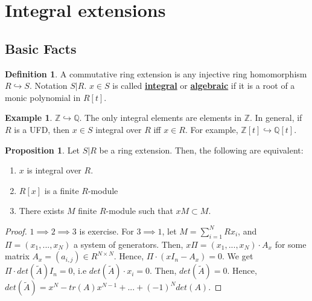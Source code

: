 \documentclass{article}
\theoremstyle{definition}
\theoremstyle{definition}
\theoremstyle{definition}
\newtheorem{proposition}{Proposition}[section]
\theoremstyle{definition}
\theoremstyle{definition}
\newtheorem{definition}{Definition}[section]
\theoremstyle{definition}
\theoremstyle{definition}
\newtheorem{example}{Example}[section]
\begin{document}
\section{Integral extensions}

\subsection{Basic Facts}
\begin{tcolorbox}[colback=purple!5!white,colframe=purple!75!black]
\begin{definition}
A commutative ring extension is any injective ring homomorphism $R\hookrightarrow S$. Notation $S|R$. $x\in S$ is called \underline{\textbf{integral}} or \underline{\textbf{algebraic}} if it is a root of a monic polynomial in $R[t]$. 
\end{definition}
\end{tcolorbox}


\begin{tcolorbox}[colback=yellow!5!white,colframe=yellow!30!white]
\begin{example}
$\mathbb{Z}\hookrightarrow \mathbb{Q}$. The only integral elements are elements in $\mathbb{Z}$. In general, if $R$ is a UFD, then $x\in S$ integral over $R$ iff $x\in R$. For example, $\mathbb{Z}[t]\hookrightarrow \mathbb{Q}[t]$. 
\end{example}
\end{tcolorbox}


\begin{tcolorbox}[colback=blue!5!white,colframe=blue!30!white]
\begin{proposition}
Let $S|R$ be a ring extension. Then, the following are equivalent:
\begin{enumerate}
    \item $x$ is integral over $R$.
    \item $R[x]$ is a finite $R$-module
    \item There exists $M$ finite $R$-module such that $xM\subset M$. 
\end{enumerate}
\end{proposition}
\end{tcolorbox}
\begin{proof}
    $1\implies 2\implies 3$ is exercise. For $3\implies 1$, let $M=\sum_{i=1}^{N}Rx_i$, and $\Pi=(x_1,...,x_N)$ a system of generators. Then, $x\Pi=(x_1,...,x_N)\cdot A_x$ for some matrix $A_x=(a_{i,j})\in R^{N\times N}$. Hence, $\Pi\cdot (xI_n-A_x)=0$. We get $\Pi\cdot det(\tilde{A})I_n=0$, i.e $det(\tilde{A})\cdot x_i=0$. Then, $det(\tilde{A})=0$. Hence, $det(\tilde{A})=x^N-tr(A)x^{N-1}+...+(-1)^{N}det(A)$. 
\end{proof}
\end{document}
